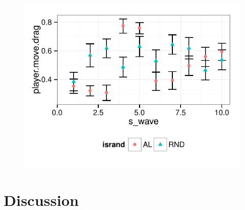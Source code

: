\documentclass{sig-alternate}
\begin{document}



\begin{figure}[tbph]
\centering
\includegraphics[width=\linewidth]{pref_drag}
\caption{}
\label{fig:pref_drag}
\end{figure}




\section{Discussion}

\end{document}
